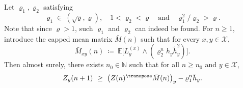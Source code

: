 \begin{refsegment}
    \begin{lem}\label{lem:cutoff}
     Let $\varrho_1,\varrho_2$ satisfying
     \begin{equation*}
      \varrho_1\in\ (\sqrt{\varrho},\varrho),\quad 
     1< \varrho_2< \varrho\quad\text{and}\quad
      \varrho_1^2/\varrho_2>\varrho.
     \end{equation*}
      Note that since $\varrho>1$, such $\varrho_1$ and $\varrho_2$ can indeed be found. For $n\geq 1$, introduce the capped mean matrix $\bar{M}(n)$ such that for every $x,y\in \mathcal{X}$,
     \begin{equation}\label{eq:matrix_cutoff}
        \bar{M}_{xy}(n)\ \coloneqq\ \mathbb{E}\big[L^{(x)}_y \wedge (\varrho_2^n h_y\tilde{h}^2_y)\big].
     \end{equation}
    Then almost surely, there exists $n_0\in \mathbb{N}$ such that for all $n\geq n_0$ and $y\in\mathcal{X}$,
\begin{equation*}
    Z_y(n+1) \ \geq\ \big(Z(n)^\transpose \bar{M}(n)\big)_y-\varrho_1^n\tilde{h}_y.
\end{equation*}
    \end{lem}


\end{refsegment}
